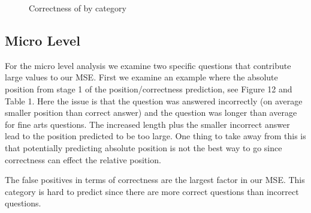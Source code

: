\documentclass[letterpaper]{article}
\begin{document}
\begin{figure}[H]
	\begin{center}
	\end{center}
	\caption{Correctness of by category}
	\label{fig:corr_off}
\end{figure}

\subsection{Micro Level}
\label{sec:micro}
For the micro level analysis we examine two specific questions that contribute large values to our MSE.  First we examine an example where the absolute position from stage 1 of the position/correctness prediction, see Figure 12 and Table 1.  Here the issue is that the question was answered incorrectly (on average smaller position than correct answer) and the question was longer than average for fine arts questions.  The increased length plus the smaller incorrect answer lead to the position predicted to be too large.  One thing to take away from this is that potentially predicting absolute position is not the best way to go since correctness can effect the relative position. 

The false positives in terms of correctness are the largest factor in our MSE.  This category is hard to predict since there are more correct questions than incorrect questions.  
\end{document}
